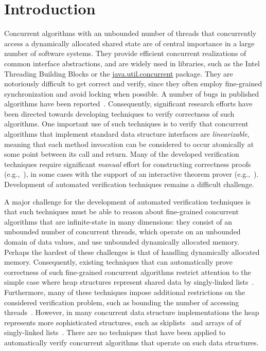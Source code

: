\section{Introduction}



Concurrent algorithms with an unbounded number of
threads that concurrently access a dynamically allocated shared state
are of central importance in a large number of software systems.
They provide efficient concurrent realizations of
common interface abstractions, and
are widely used in libraries,
such as the Intel Threading Building Blocks or
the \url{java.util.concurrent} package.
They are notoriously difficult to get correct and verify, since they
often employ fine-grained synchronization and avoid locking when
possible. A number of bugs  in published
algorithms have been reported~\cite{DDGJLMMSS:dcas,MiSc:correction}.
Consequently, significant research efforts have been directed towards developing
techniques to verify correctness of such algorithms. One important use
of such techniques is
to verify that concurrent algorithms that implement standard data structure
interfaces are {\em linearizable}, meaning that
each method invocation can be considered to occur atomically at some point
between its call and return.
Many of the developed verification techniques require significant
{\em manual} effort for constructing correctness proofs
(e.g.,~\cite{LF:pldi13,Vafeiadis:Thesis}),
in some cases with the support of an interactive theorem prover
(e.g.,~\cite{Aaron:logical:linearizability,Colvin:Lazy-List,Derrick:fm14,SWD:cav12,SDW:tcl14}).
Development of automated verification techniques remains a difficult challenge.

A major challenge for the development of automated verification techniques
is that such techniques must be
able to reason about fine-grained concurrent algorithms that are infinite-state
in many dimensions:
they consist of an unbounded number of concurrent threads, which
operate on an unbounded domain of data values, and use
unbounded dynamically allocated memory. 
Perhaps the hardest of these challenges is that of handling 
dynamically allocated memory.
Consequently, existing techniques that can automatically prove correctness
of such fine-grained concurrent algorithms restrict attention to the simple
case where heap structures represent shared data by singly-linked 
lists~\cite{AHHR:integrated,meyer:vmcai16,Quy:sas16,Sagiv:correlation,Vafeiadis:cav10}. Furthermore, many of these techniques impose additional restrictions on the considered verification problem, such as bounding the number of accessing
threads~\cite{Amit:comparisonAbstraction,Vechev:spin09,CernyRZCA:CAV10}.
However, in many concurrent data structure implementations the heap represents
more sophisticated structures, such as 
skiplists~\cite{Fomitchev:2004,ArtOfMpP,Sundell:2005} and arrays of
of singly-linked lists~\cite{ts-stack}. There are no
techniques that have been applied to automatically verify concurrent algorithms
that operate on such data structures.


